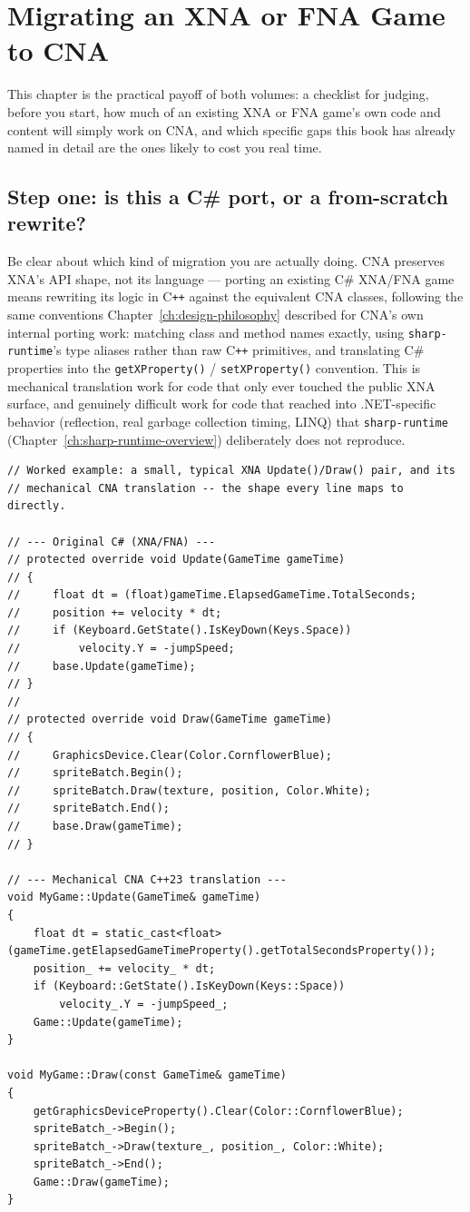\chapter{Migrating an XNA or FNA Game to CNA}
\label{ch:migration-guide}

This chapter is the practical payoff of both volumes: a checklist for judging, before you
start, how much of an existing XNA or FNA game's own code and content will simply work on
CNA, and which specific gaps this book has already named in detail are the ones likely to
cost you real time.

\section{Step one: is this a C\# port, or a from-scratch rewrite?}

Be clear about which kind of migration you are actually doing. CNA preserves XNA's API
shape, not its language --- porting an existing C\# XNA/FNA game means rewriting its logic in
C\texttt{++} against the equivalent CNA classes, following the same conventions
Chapter~\ref{ch:design-philosophy} described for CNA's own internal porting work:
matching class and method names exactly, using \texttt{sharp-runtime}'s type aliases rather
than raw C\texttt{++} primitives, and translating C\# properties into the
\texttt{getXProperty()} / \texttt{setXProperty()} convention. This is mechanical translation
work for code that only ever touched the public XNA surface, and genuinely difficult work for
code that reached into .NET-specific behavior (reflection, real garbage collection timing,
LINQ) that \texttt{sharp-runtime} (Chapter~\ref{ch:sharp-runtime-overview}) deliberately does
not reproduce.

\begin{lstlisting}
// Worked example: a small, typical XNA Update()/Draw() pair, and its
// mechanical CNA translation -- the shape every line maps to directly.

// --- Original C# (XNA/FNA) ---
// protected override void Update(GameTime gameTime)
// {
//     float dt = (float)gameTime.ElapsedGameTime.TotalSeconds;
//     position += velocity * dt;
//     if (Keyboard.GetState().IsKeyDown(Keys.Space))
//         velocity.Y = -jumpSpeed;
//     base.Update(gameTime);
// }
//
// protected override void Draw(GameTime gameTime)
// {
//     GraphicsDevice.Clear(Color.CornflowerBlue);
//     spriteBatch.Begin();
//     spriteBatch.Draw(texture, position, Color.White);
//     spriteBatch.End();
//     base.Draw(gameTime);
// }

// --- Mechanical CNA C++23 translation ---
void MyGame::Update(GameTime& gameTime)
{
    float dt = static_cast<float>(gameTime.getElapsedGameTimeProperty().getTotalSecondsProperty());
    position_ += velocity_ * dt;
    if (Keyboard::GetState().IsKeyDown(Keys::Space))
        velocity_.Y = -jumpSpeed_;
    Game::Update(gameTime);
}

void MyGame::Draw(const GameTime& gameTime)
{
    getGraphicsDeviceProperty().Clear(Color::CornflowerBlue);
    spriteBatch_->Begin();
    spriteBatch_->Draw(texture_, position_, Color::White);
    spriteBatch_->End();
    Game::Draw(gameTime);
}
\end{lstlisting}

